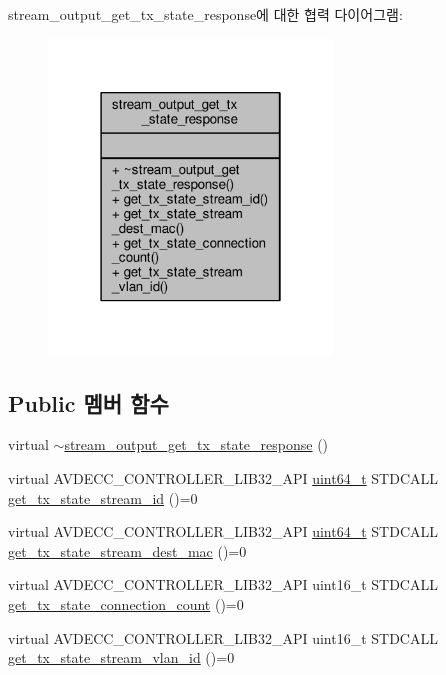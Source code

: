 stream\+\_\+output\+\_\+get\+\_\+tx\+\_\+state\+\_\+response에 대한 협력 다이어그램\+:
\nopagebreak
\begin{figure}[H]
\begin{center}
\leavevmode
\includegraphics[width=214pt]{classavdecc__lib_1_1stream__output__get__tx__state__response__coll__graph}
\end{center}
\end{figure}
\subsection*{Public 멤버 함수}
\begin{DoxyCompactItemize}
\item 
virtual \hyperlink{classavdecc__lib_1_1stream__output__get__tx__state__response_ada95565f520148b3427b69d9b8929b33}{$\sim$stream\+\_\+output\+\_\+get\+\_\+tx\+\_\+state\+\_\+response} ()
\item 
virtual A\+V\+D\+E\+C\+C\+\_\+\+C\+O\+N\+T\+R\+O\+L\+L\+E\+R\+\_\+\+L\+I\+B32\+\_\+\+A\+PI \hyperlink{parse_8c_aec6fcb673ff035718c238c8c9d544c47}{uint64\+\_\+t} S\+T\+D\+C\+A\+LL \hyperlink{classavdecc__lib_1_1stream__output__get__tx__state__response_a70413bbd0422049658122c5103e0d948}{get\+\_\+tx\+\_\+state\+\_\+stream\+\_\+id} ()=0
\item 
virtual A\+V\+D\+E\+C\+C\+\_\+\+C\+O\+N\+T\+R\+O\+L\+L\+E\+R\+\_\+\+L\+I\+B32\+\_\+\+A\+PI \hyperlink{parse_8c_aec6fcb673ff035718c238c8c9d544c47}{uint64\+\_\+t} S\+T\+D\+C\+A\+LL \hyperlink{classavdecc__lib_1_1stream__output__get__tx__state__response_a0afd9b8a130eca8b72c62dd327a4922c}{get\+\_\+tx\+\_\+state\+\_\+stream\+\_\+dest\+\_\+mac} ()=0
\item 
virtual A\+V\+D\+E\+C\+C\+\_\+\+C\+O\+N\+T\+R\+O\+L\+L\+E\+R\+\_\+\+L\+I\+B32\+\_\+\+A\+PI uint16\+\_\+t S\+T\+D\+C\+A\+LL \hyperlink{classavdecc__lib_1_1stream__output__get__tx__state__response_aa12c38f566d4d5f8263278d2f926ae68}{get\+\_\+tx\+\_\+state\+\_\+connection\+\_\+count} ()=0
\item 
virtual A\+V\+D\+E\+C\+C\+\_\+\+C\+O\+N\+T\+R\+O\+L\+L\+E\+R\+\_\+\+L\+I\+B32\+\_\+\+A\+PI uint16\+\_\+t S\+T\+D\+C\+A\+LL \hyperlink{classavdecc__lib_1_1stream__output__get__tx__state__response_a6965d78cf766e94db678a379dc96ab91}{get\+\_\+tx\+\_\+state\+\_\+stream\+\_\+vlan\+\_\+id} ()=0
\end{DoxyCompactItemize}


